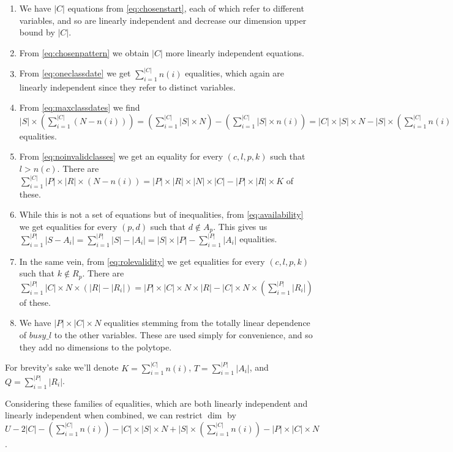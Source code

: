 \begin{enumerate}
\item We have $|C|$ equations from \ref{eq:chosenstart}, each of which refer to different variables, and so are linearly independent and decrease our dimension upper bound by $|C|$.
\item From \ref{eq:chosenpattern} we obtain $|C|$ more linearly independent equations.
\item From \ref{eq:oneclassdate} we get $\sum_{i = 1}^{|C|} n(i)$ equalities, which again are linearly independent since they refer to distinct variables.
\item From \ref{eq:maxclassdates} we find $|S| \times (\sum_{i=1}^{|C|} (N - n(i))) = (\sum_{i=1}^{|C|} |S| \times N) - (\sum_{i=1}^{|C|} |S| \times n(i)) = |C| \times |S| \times N - |S| \times (\sum_{i = 1}^{|C|} n(i))$ equalities.
\item From \ref{eq:noinvalidclasses} we get an equality for every $(c, l, p, k)$ such that $l > n(c)$. There are $\sum_{i = 1}^{|C|} |P| \times |R| \times (N - n(i)) = |P| \times |R| \times |N| \times |C| - |P| \times |R| \times K$ of these.
\item While this is not a set of equations but of inequalities, from \ref{eq:availability} we get equalities for every $(p, d)$ such that $d \not\in A_p$. This gives us $\sum_{i=1}^{|P|} |S - A_i| = \sum_{i=1}^{|P|} |S| - |A_i| = |S| \times |P| - \sum_{i=1}^{|P|} |A_i|$ equalities.
\item In the same vein, from \ref{eq:rolevalidity} we get equalities for every $(c, l, p, k)$ such that $k \not\in R_p$. There are $\sum_{i = 1}^{|P|} |C| \times N \times (|R| - |R_i|) = |P| \times |C| \times N \times |R| - |C| \times N \times (\sum_{i=1}^{|P|} |R_i|)$ of these.
\item We have $|P| \times |C| \times N$ equalities stemming from the totally linear dependence of $busy\_l$ to the other variables. These are used simply for convenience, and so they add no dimensions to the polytope.
\end{enumerate}

For brevity's sake we'll denote $K = \sum_{i=1}^{|C|} n(i)$, $T = \sum_{i=1}^{|P|} |A_i|$, and $Q = \sum_{i=1}^{|P|} |R_i|$.

Considering these families of equalities, which are both linearly independent and linearly independent when combined, we can restrict $\dim$ by $U - 2|C| - (\sum_{i = 1}^{|C|} n(i)) - |C| \times |S| \times N + |S| \times (\sum_{i = 1}^{|C|} n(i)) - |P| \times |C| \times N$.


